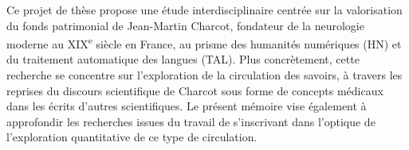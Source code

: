 \minitoc%


Ce projet de thèse propose une étude interdisciplinaire centrée sur la valorisation du fonds patrimonial de Jean-Martin Charcot, fondateur de la neurologie moderne au XIX\textsuperscript{e} siècle en France, au prisme des humanités numériques (\textsc{HN}) et du traitement automatique des langues (\textsc{TAL}). Plus concrètement, cette recherche se concentre sur l'exploration de la circulation des savoirs, à travers les reprises du discours scientifique de Charcot sous forme de concepts médicaux dans les écrits d'autres scientifiques. Le présent mémoire vise également à approfondir les recherches issues du travail de \citet{petkovic2023circulation} s'inscrivant dans l'optique de l'exploration quantitative de ce type de circulation. 
